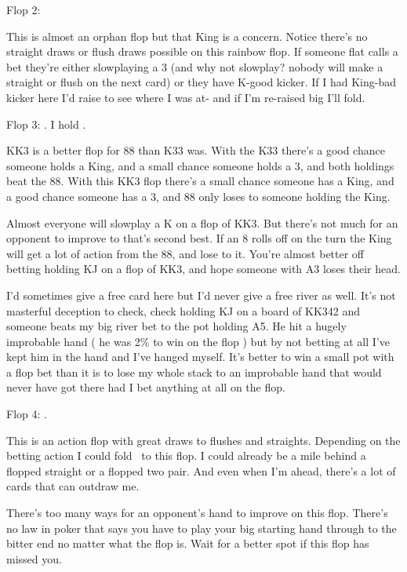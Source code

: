 Flop 2: \Kh\tred\tres

This is almost an orphan flop but that King is a concern. Notice
there's no straight draws or flush draws possible on this rainbow flop.
If someone flat calls a bet they're either slowplaying a 3
(and why not slowplay? nobody will make a straight or flush on the next card)
or they have K-good kicker. If I had King-bad kicker here I'd raise to see
where I was at- and if I'm re-raised big I'll fold.

Flop 3: \Kh\Kd\treh. I hold \eigc\eigd.

KK3 is a better flop for 88 than K33 was. With the K33 there's a good
chance someone holds a King, and a small chance someone holds a 3,
and both holdings beat the 88. With this KK3 flop there's a small chance
someone has a King, and a good chance someone has a 3, and 88 only loses
to someone holding the King.

Almost everyone will slowplay a K on a flop of KK3. But there's not much
for an opponent to improve to that's second best. If an 8 rolls off on
the turn the King will get a lot of action from the 88, and lose to it.
You're almost better off betting holding KJ on a flop of KK3, and hope
someone with A3 loses their head.

I'd sometimes give a free card here but I'd never give a free river as well.
It's not masterful deception to check, check holding KJ on a board of
KK342 and someone beats my big river bet to the pot holding A5. He hit
a hugely improbable hand ( he was 2\% to win on the flop ) but by
not betting at all I've kept him in the hand and I've hanged myself.
It's better to win a small pot with a flop bet than it is to lose
my whole stack to an improbable hand that would never have got there
had I bet anything at all on the flop.

Flop 4: \tenh\nined\eigd.

This is an action flop with great draws to flushes and straights. Depending
on the betting action I could fold \Ks\Kc\ to this flop. I could already be
a mile behind a flopped straight or a flopped two pair.  And even when
I'm ahead, there's a lot of cards that can outdraw me.


There's too many ways for an opponent's hand to improve on this flop.
There's no law in poker that says you have to play your big starting
hand through to the bitter end no matter what the flop is. Wait for a
better spot if this flop has missed you.

